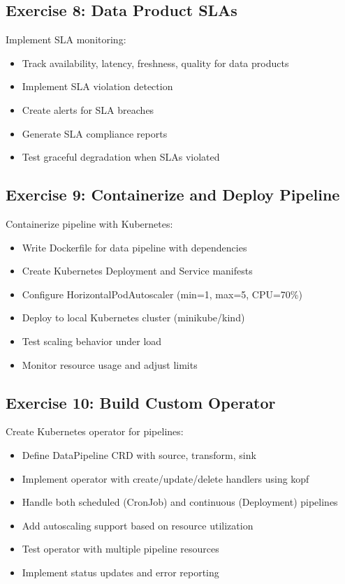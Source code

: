 \subsection{Exercise 8: Data Product SLAs}

Implement SLA monitoring:
\begin{itemize}
    \item Track availability, latency, freshness, quality for data products
    \item Implement SLA violation detection
    \item Create alerts for SLA breaches
    \item Generate SLA compliance reports
    \item Test graceful degradation when SLAs violated
\end{itemize}

\subsection{Exercise 9: Containerize and Deploy Pipeline}

Containerize pipeline with Kubernetes:
\begin{itemize}
    \item Write Dockerfile for data pipeline with dependencies
    \item Create Kubernetes Deployment and Service manifests
    \item Configure HorizontalPodAutoscaler (min=1, max=5, CPU=70\%)
    \item Deploy to local Kubernetes cluster (minikube/kind)
    \item Test scaling behavior under load
    \item Monitor resource usage and adjust limits
\end{itemize}

\subsection{Exercise 10: Build Custom Operator}

Create Kubernetes operator for pipelines:
\begin{itemize}
    \item Define DataPipeline CRD with source, transform, sink
    \item Implement operator with create/update/delete handlers using kopf
    \item Handle both scheduled (CronJob) and continuous (Deployment) pipelines
    \item Add autoscaling support based on resource utilization
    \item Test operator with multiple pipeline resources
    \item Implement status updates and error reporting
\end{itemize}

